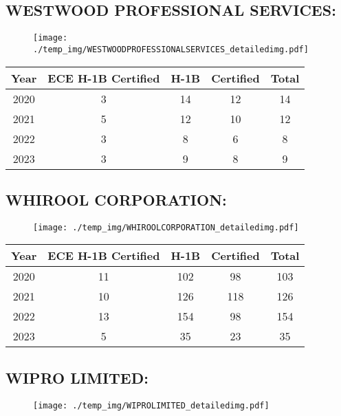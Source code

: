 \documentclass{article}%
\begin{document}
%
\newpage%
\subsection{WESTWOOD PROFESSIONAL SERVICES:}%
\label{subsec:WESTWOODPROFESSIONALSERVICES}%
\label{WESTWOODPROFESSIONALSERVICESdetailed}%


\begin{figure}[htbp]%
\centering%
\texttt{[image: ./temp\_img/WESTWOODPROFESSIONALSERVICES\_detailedimg.pdf]}%
\end{figure}

%
\begin{longtable}{c|c|c|c|c}%
\hline%
Year&ECE H{-}1B Certified&H{-}1B&Certified&Total\\%
\hline%
2020&3&14&12&14\\%
\hline%
2021&5&12&10&12\\%
\hline%
2022&3&8&6&8\\%
\hline%
2023&3&9&8&9\\%
\hline%
\end{longtable}

%
\newpage%
\subsection{WHIROOL CORPORATION:}%
\label{subsec:WHIROOLCORPORATION}%
\label{WHIROOLCORPORATIONdetailed}%


\begin{figure}[htbp]%
\centering%
\texttt{[image: ./temp\_img/WHIROOLCORPORATION\_detailedimg.pdf]}%
\end{figure}

%
\begin{longtable}{c|c|c|c|c}%
\hline%
Year&ECE H{-}1B Certified&H{-}1B&Certified&Total\\%
\hline%
2020&11&102&98&103\\%
\hline%
2021&10&126&118&126\\%
\hline%
2022&13&154&98&154\\%
\hline%
2023&5&35&23&35\\%
\hline%
\end{longtable}

%
\newpage%
\subsection{WIPRO LIMITED:}%
\label{subsec:WIPROLIMITED}%
\label{WIPROLIMITEDdetailed}%


\begin{figure}[htbp]%
\centering%
\texttt{[image: ./temp\_img/WIPROLIMITED\_detailedimg.pdf]}%
\end{figure}
\end{document}
